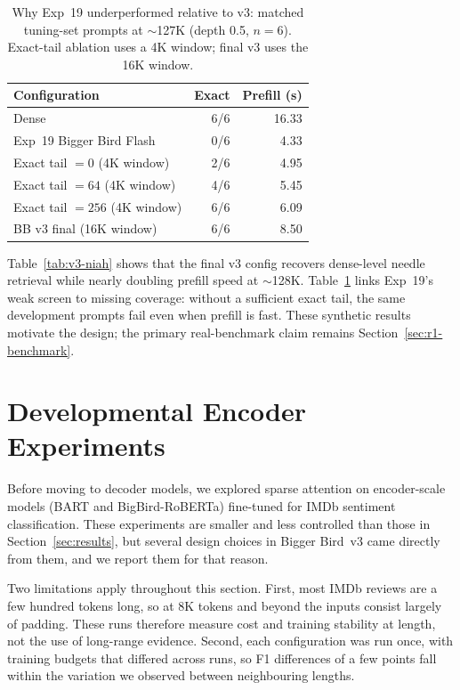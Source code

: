 \documentclass[11pt]{article}
\begin{document}
\begin{table}[ht]
  \centering
  \small
  \caption{Why Exp~19 underperformed relative to v3: matched tuning-set
  prompts at $\sim$127K (depth 0.5, $n{=}6$). Exact-tail ablation uses a 4K
  window; final v3 uses the 16K window.}
  \label{tab:v3-ablate}
  \begin{tabular}{@{}lrr@{}}
    \toprule
    Configuration & Exact & Prefill (s) \\
    \midrule
    Dense & 6/6 & 16.33 \\
    Exp~19 Bigger Bird Flash & 0/6 & 4.33 \\
    Exact tail $=0$ (4K window) & 2/6 & 4.95 \\
    Exact tail $=64$ (4K window) & 4/6 & 5.45 \\
    Exact tail $=256$ (4K window) & 6/6 & 6.09 \\
    BB v3 final (16K window) & 6/6 & 8.50 \\
    \bottomrule
  \end{tabular}
\end{table}

Table~\ref{tab:v3-niah} shows that the final v3 config recovers dense-level
needle retrieval while nearly doubling prefill speed at $\sim$128K.
Table~\ref{tab:v3-ablate} links Exp~19's weak screen to missing coverage:
without a sufficient exact tail, the same development prompts fail even when
prefill is fast. These synthetic results motivate the design; the primary
real-benchmark claim remains Section~\ref{sec:r1-benchmark}.


\section{Developmental Encoder Experiments}
\label{sec:developmental}

Before moving to decoder models, we explored sparse attention on
encoder-scale models (BART and BigBird-RoBERTa) fine-tuned for IMDb
sentiment classification. These experiments are smaller and less controlled
than those in Section~\ref{sec:results}, but several design choices in Bigger
Bird~v3 came directly from them, and we report them for that reason.

Two limitations apply throughout this section. First, most IMDb reviews are a
few hundred tokens long, so at 8K tokens and beyond the inputs consist largely
of padding. These runs therefore measure cost and training stability at
length, not the use of long-range evidence. Second, each configuration was
run once, with training budgets that differed across runs, so F1 differences
of a few points fall within the variation we observed between neighbouring
lengths.
\end{document}
